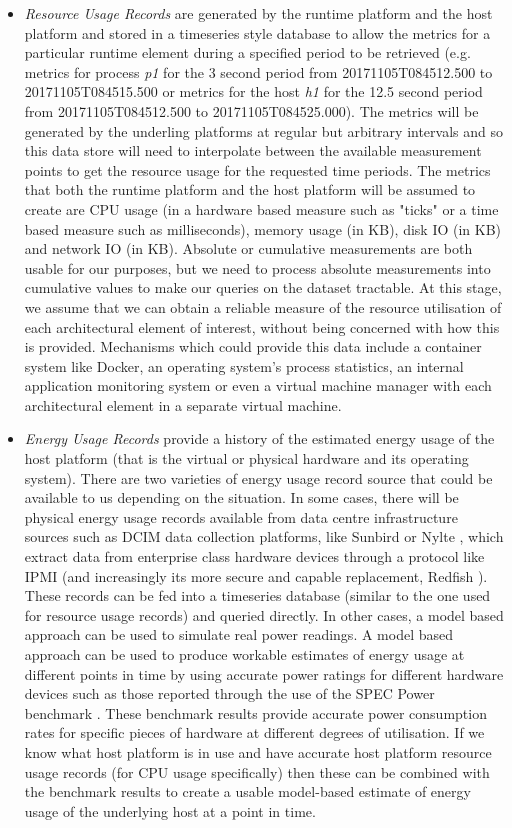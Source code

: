 \begin{itemize}
\item \emph{Resource Usage Records} are generated by the runtime platform and the host platform and stored in a timeseries style database to allow the metrics for a particular runtime element during a specified period to be retrieved (e.g. metrics for process \emph{p1} for the 3 second period from 20171105T084512.500 to 20171105T084515.500 or metrics for the host \emph{h1} for the 12.5 second period from 20171105T084512.500 to 20171105T084525.000).  The metrics will be generated by the underling platforms at regular but arbitrary intervals and so this data store will need to interpolate between the available measurement points to get the resource usage for the requested time periods.  The metrics that both the runtime platform and the host platform will be assumed to create are CPU usage (in a hardware based measure such as "ticks" or a time based measure such as milliseconds), memory usage (in KB), disk IO (in KB) and network IO (in KB).  Absolute or cumulative measurements are both usable for our purposes, but we need to process absolute measurements into cumulative values to make our queries on the dataset tractable.  At this stage, we assume that we can obtain a reliable measure of the resource utilisation of each architectural element of interest, without being concerned with how this is provided.  Mechanisms which could provide this data include a container system like Docker, an operating system's process statistics, an internal application monitoring system or even a virtual machine manager with each architectural element in a separate virtual machine.

\item \emph{Energy Usage Records} provide a history of the estimated energy usage of the host platform (that is the virtual or physical hardware and its operating system).  There are two varieties of energy usage record source that could be available to us depending on the situation.  In some cases, there will be physical energy usage records available from data centre infrastructure sources such as DCIM data collection platforms, like Sunbird \cite{sunbird2018} or Nylte \cite{nlyte2018}, which extract data from enterprise class hardware devices through a protocol like IPMI \cite{ipmi2013} (and increasingly its more secure and capable replacement, Redfish \cite{dmtf2018-redfish}).  These records can be fed into a timeseries database (similar to the one used for resource usage records) and queried directly.  In other cases, a model based approach can be used to simulate real power readings.  A model based approach can be used to produce workable estimates of energy usage at different points in time by using accurate power ratings for different hardware devices such as those reported through the use of the SPEC Power benchmark \cite{lange2009-specpower}.  These benchmark results provide accurate power consumption rates for specific pieces of hardware at different degrees of utilisation.  If we know what host platform is in use and have accurate host platform resource usage records (for CPU usage specifically) then these can be combined with the benchmark results to create a usable model-based estimate of energy usage of the underlying host at a point in time.


\end{itemize}
